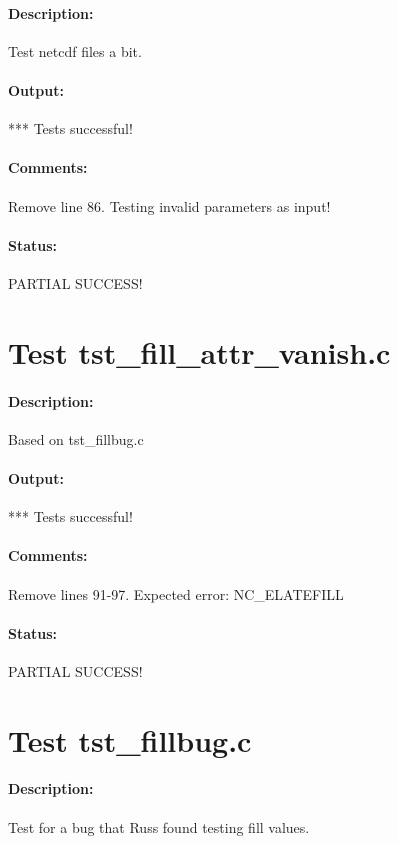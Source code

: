 \paragraph{Description:} Test netcdf files a bit.

\paragraph{Output:} *** Tests successful!

\paragraph{Comments:} Remove line 86. Testing invalid parameters as input!

\paragraph{Status:} PARTIAL SUCCESS!

\section{Test tst\_fill\_attr\_vanish.c}

\paragraph{Description:} Based on tst\_fillbug.c

\paragraph{Output:} *** Tests successful!

\paragraph{Comments:} Remove lines 91-97. Expected error: NC\_ELATEFILL

\paragraph{Status:} PARTIAL SUCCESS!

\section{Test tst\_fillbug.c}

\paragraph{Description:} Test for a bug that Russ found testing fill values.

